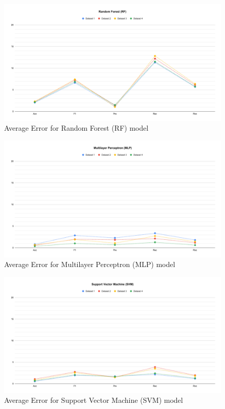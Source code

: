 \begin{figure}[ht]
    \centering
    \includegraphics[width=1.9\columnwidth]{media/ch_result_and_testing/delta_RF.pdf}
    \caption{Average Error for Random Forest (RF) model} \label{fig:perfromance_delta_rf}
\end{figure}

\begin{figure}[ht]
    \centering
    \includegraphics[width=1.9\columnwidth]{media/ch_result_and_testing/delta_MLP.pdf}
    \caption{Average Error for Multilayer Perceptron (MLP) model} \label{fig:perfromance_delta_mlp}
\end{figure}

\begin{figure}[ht]
    \centering
    \includegraphics[width=1.9\columnwidth]{media/ch_result_and_testing/delta_SVM.pdf}
    \caption{Average Error for Support Vector Machine (SVM) model} \label{fig:perfromance_delta_svm}
\end{figure}
